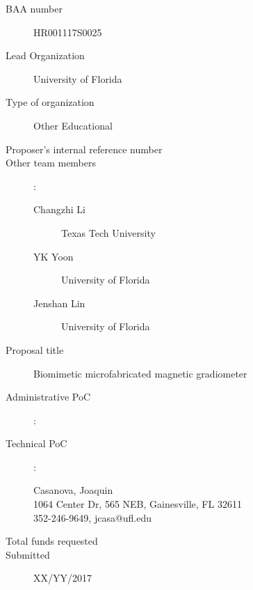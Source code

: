 
\begin{description}
\item [BAA number] HR001117S0025
\item [Lead Organization] University of Florida
\item [Type of organization] Other Educational
\item [Proposer’s internal reference number]
\item [Other team members]:
\begin{description}
\item [Changzhi Li] Texas Tech University
\item [YK Yoon] University of Florida 
\item [Jenshan Lin] University of Florida 
\end{description}
\item [Proposal title] Biomimetic microfabricated magnetic gradiometer
\item [Administrative PoC]:
\begin{description}
\item []
\item []
\item []
\end{description}
\item [Technical PoC]:
\begin{description}
\item [Casanova, Joaquin]
\item [1064 Center Dr, 565 NEB, Gainesville, FL 32611]
\item [352-246-9649, jcasa@ufl.edu]
\end{description}
\item [Total funds requested]
\item [Submitted] XX/YY/2017
\end{description}
